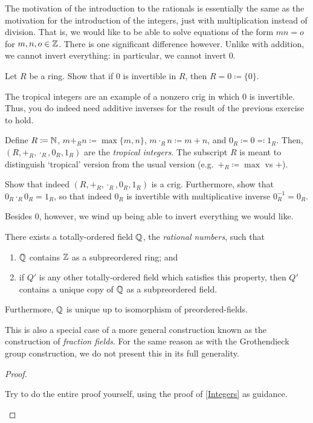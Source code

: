 The motivation of the introduction to the rationals is essentially the same as the motivation for the introduction of the integers, just with multiplication instead of division.  That is, we would like to be able to solve equations of the form $mn=o$ for $m,n,o\in \mathbb{Z}$.  There is one significant difference however.  Unlike with addition, we cannot invert everything:  in particular, we cannot invert $0$.
\begin{exr}
Let $R$ be a ring.  Show that if $0$ is invertible in $R$, then $R=0\coloneqq \{ 0\}$.
\end{exr}
\begin{exm}\label{exm1.3.2}
The tropical integers are an example of a nonzero crig in which $0$ is invertible.  Thus, you do indeed need additive inverses for the result of the previous exercise to hold.

Define $R\coloneqq \mathbb{N}$, $m+_Rn\coloneqq \max \{ m,n\}$, $m\cdot _Rn\coloneqq m+n$, and $0_R\coloneqq 0\eqqcolon 1_R$.  Then, $(R,+_R,\cdot _R,0_R,1_R)$ are the \emph{tropical integers}.  The subscript $R$ is meant to distinguish `tropical' version from the usual version (e.g.~$+_R\coloneqq \max$ vs $+$).
\begin{exr}
Show that indeed $(R,+_R,\cdot _R,0_R,1_R)$ is a crig.  Furthermore, show that $0_R\cdot _R0_R=1_R$, so that indeed $0_R$ is invertible with multiplicative inverse $0_R^{-1}=0_R$.
\end{exr}
\end{exm}
Besides $0$, however, we wind up being able to invert everything we would like.
\begin{thm}\label{RationalNumbers}
There exists a totally-ordered field $\mathbb{Q}$, the \emph{rational numbers}, such that
\begin{enumerate}
\item \label{enm1.3.2.i}$\mathbb{Q}$ contains $\mathbb{Z}$ as a subpreordered ring; and
\item \label{enm1.3.2.ii}if $Q'$ is any other totally-ordered field which satisfies this property, then $Q'$ contains a unique copy of $\mathbb{Q}$ as a subpreordered field.
\end{enumerate}
Furthermore, $\mathbb{Q}$ is unique up to isomorphism of preordered-fields.
\begin{rmk}
This is also a special case of a more general construction known as the construction of \emph{fraction fields}.  For the same reason as with the Grothendieck group construction, we do not present this in its full generality.
\end{rmk}
\begin{proof}
\begin{exr}
Try to do the entire proof yourself, using the proof of \cref{Integers} as guidance.
\end{exr}
\end{proof}
\end{thm}

